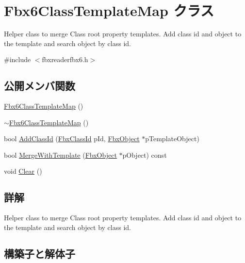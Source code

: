 \hypertarget{class_fbx6_class_template_map}{}\section{Fbx6\+Class\+Template\+Map クラス}
\label{class_fbx6_class_template_map}


Helper class to merge Class root property templates. Add class id and object to the template and search object by class id.  




{\ttfamily \#include $<$fbxreaderfbx6.\+h$>$}

\subsection*{公開メンバ関数}
\begin{DoxyCompactItemize}
\item 
\hyperlink{class_fbx6_class_template_map_a797c75312154457d38978b6c4046891e}{Fbx6\+Class\+Template\+Map} ()
\item 
\hyperlink{class_fbx6_class_template_map_af1b623f6de8fefd4c4515a66e40a2bec}{$\sim$\+Fbx6\+Class\+Template\+Map} ()
\item 
bool \hyperlink{class_fbx6_class_template_map_a064f7a5f731932c34a257fe9947c3981}{Add\+Class\+Id} (\hyperlink{class_fbx_class_id}{Fbx\+Class\+Id} p\+Id, \hyperlink{class_fbx_object}{Fbx\+Object} $\ast$p\+Template\+Object)
\item 
bool \hyperlink{class_fbx6_class_template_map_a93b436ce1ce8f65302b675cb3a085134}{Merge\+With\+Template} (\hyperlink{class_fbx_object}{Fbx\+Object} $\ast$p\+Object) const
\item 
void \hyperlink{class_fbx6_class_template_map_a522d86033875290b78d0034909997fde}{Clear} ()
\end{DoxyCompactItemize}


\subsection{詳解}
Helper class to merge Class root property templates. Add class id and object to the template and search object by class id. 

\subsection{構築子と解体子}
\mbox{\label{class_fbx6_class_template_map_a797c75312154457d38978b6c4046891e}} 
